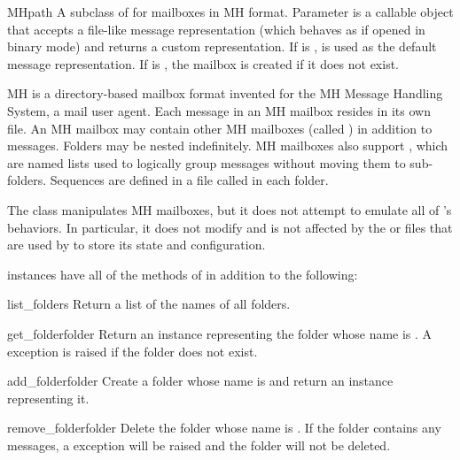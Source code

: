 \begin{classdesc}{MH}{path}
A subclass of  for mailboxes in MH format. Parameter
 is a callable object that accepts a file-like message
representation (which behaves as if opened in binary mode) and returns a custom
representation. If  is ,  is used as
the default message representation. If  is , the mailbox
is created if it does not exist.
\end{classdesc}

MH is a directory-based mailbox format invented for the MH Message Handling
System, a mail user agent. Each message in an MH mailbox resides in its own
file. An MH mailbox may contain other MH mailboxes (called ) in
addition to messages. Folders may be nested indefinitely. MH mailboxes also
support , which are named lists used to logically group messages
without moving them to sub-folders. Sequences are defined in a file called
 in each folder.

The  class manipulates MH mailboxes, but it does not attempt to
emulate all of 's behaviors. In particular, it does not modify and
is not affected by the  or  files that are used
by  to store its state and configuration.

 instances have all of the methods of  in addition to
the following:

\begin{methoddesc}{list_folders}{}
Return a list of the names of all folders.
\end{methoddesc}

\begin{methoddesc}{get_folder}{folder}
Return an  instance representing the folder whose name is
. A  exception is raised if the
folder does not exist.
\end{methoddesc}

\begin{methoddesc}{add_folder}{folder}
Create a folder whose name is  and return an  instance
representing it.
\end{methoddesc}

\begin{methoddesc}{remove_folder}{folder}
Delete the folder whose name is . If the folder contains any
messages, a  exception will be raised and the folder
will not be deleted.
\end{methoddesc}

